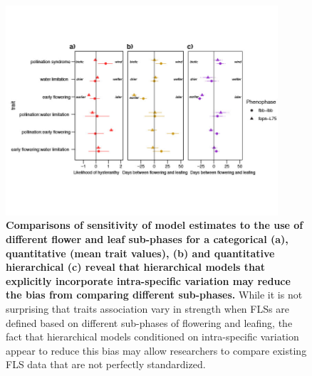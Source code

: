 \documentclass[11pt]{article}
\begin{document}
    
\begin{figure}[H]
\centering
\includegraphics[width=0.9\textwidth]{..//..//HFmodelplots4SUPP-01.jpg} 
  \caption{\textbf{Comparisons of sensitivity of model estimates to the use of different flower and leaf sub-phases for a categorical  \textbf{(a)}, quantitative (mean trait values), \textbf{(b)} and quantitative hierarchical \textbf{(c)} reveal that hierarchical models that explicitly incorporate intra-specific variation may reduce the bias from comparing different sub-phases.} While it is not surprising that traits association vary in strength when FLSs are defined based on different sub-phases of flowering and leafing, the fact that hierarchical models conditioned on intra-specific variation appear to reduce this bias may allow researchers to compare existing FLS data that are not perfectly standardized.}
    \label{fig:sensitivity}
    \end{figure}
\end{document}
